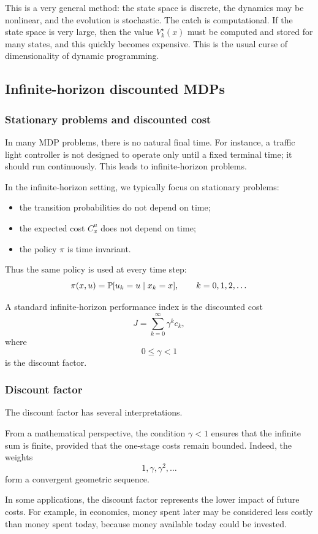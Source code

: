 This is a very general method: the state space is discrete, the dynamics may be nonlinear, and
the evolution is stochastic. The catch is computational. If the state space is very large, then
the value \(V_k^\star(x)\) must be computed and stored for many states, and this quickly becomes
expensive. This is the usual curse of dimensionality of dynamic programming.

\subsection{Infinite-horizon discounted MDPs}
\subsubsection{Stationary problems and discounted cost}

In many MDP problems, there is no natural final time. For instance, a traffic light controller is
not designed to operate only until a fixed terminal time; it should run continuously. This leads
to infinite-horizon problems.

In the infinite-horizon setting, we typically focus on stationary problems:
\begin{itemize}
    \item the transition probabilities do not depend on time;
    \item the expected cost \(C_x^u\) does not depend on time;
    \item the policy \(\pi\) is time invariant.
\end{itemize}
Thus the same policy is used at every time step:
\[
\pi(x,u)=\mathbb{P}[u_k=u\mid x_k=x],
\qquad k=0,1,2,\dots
\]

A standard infinite-horizon performance index is the discounted cost
\[
J
=
\sum_{k=0}^{\infty}\gamma^k c_k,
\]
where
\[
0\le \gamma <1
\]
is the discount factor.

\subsubsection{Discount factor}

The discount factor has several interpretations.

From a mathematical perspective, the condition \(\gamma<1\) ensures that the infinite sum is
finite, provided that the one-stage costs remain bounded. Indeed, the weights
\[
1,\gamma,\gamma^2,\dots
\]
form a convergent geometric sequence.

In some applications, the discount factor represents the lower impact of future costs. For
example, in economics, money spent later may be considered less costly than money spent today,
because money available today could be invested.

